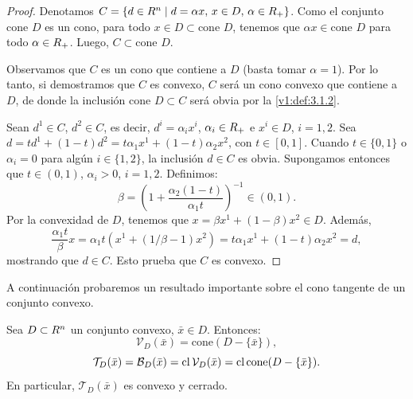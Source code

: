 \begin{proof}
 Denotamos $C = \{d \in R^n \mid d = \alpha x, \, x \in D, \, \alpha \in R_+\}$. Como el conjunto $\text{cone } D$ es un cono, para todo $x \in D \subset \text{cone } D$, tenemos que $\alpha x \in \text{cone } D$ para todo $\alpha \in R_+$. Luego, $C \subset \text{cone } D$.
 
 Observamos que $C$ es un cono que contiene a $D$ (basta tomar $\alpha = 1$). Por lo tanto, si demostramos que $C$ es convexo, $C$ será un cono convexo que contiene a $D$, de donde la inclusión $\text{cone } D \subset C$ será obvia por la \cref{v1:def:3.1.2}.
 
 Sean $d^1 \in C$, $d^2 \in C$, es decir, $d^i = \alpha_i x^i$, $\alpha_i \in R_+$ e $x^i \in D$, $i = 1, 2$. Sea $d = t d^1 + (1 - t)d^2 = t \alpha_1 x^1 + (1 - t)\alpha_2 x^2$, con $t \in [0, 1]$. Cuando $t \in \{0, 1\}$ o $\alpha_i = 0$ para algún $i \in \{1, 2\}$, la inclusión $d \in C$ es obvia. Supongamos entonces que $t \in (0, 1)$, $\alpha_i > 0$, $i = 1, 2$. Definimos:
 \[
 \beta = \left(1 + \frac{\alpha_2(1-t)}{\alpha_1 t}\right)^{-1} \in (0, 1).
 \]
 Por la convexidad de $D$, tenemos que $x = \beta x^1 + (1 - \beta)x^2 \in D$. Además,
 \[
 \frac{\alpha_1 t}{\beta} x = \alpha_1 t (x^1 + (1/\beta - 1)x^2) = t \alpha_1 x^1 + (1 - t)\alpha_2 x^2 = d,
 \]
 mostrando que $d \in C$. Esto prueba que $C$ es convexo.
\end{proof}

A continuación probaremos un resultado importante sobre el cono tangente de un conjunto convexo.

\begin{theorem}\label{v1:thm:3.1.1}
 Sea $D \subset R^n$ un conjunto convexo, $\bar{x} \in D$. Entonces:
 \[
 \mathcal{V}_D(\bar{x}) = \text{cone}(D - \{\bar{x}\}),
 \]
 \[
 \mathcal{T}_D(\bar{x}) = \mathcal{B}_D(\bar{x}) = \operatorname{cl} \mathcal{V}_D(\bar{x}) = \operatorname{cl} \text{cone}(D - \{\bar{x}\}).
 \]
 En particular, $\mathcal{T}_D(\bar{x})$ es convexo y cerrado.
\end{theorem}

